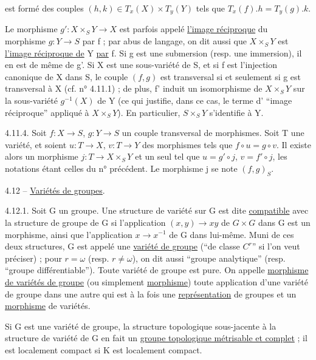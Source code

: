 est formé des couples $(h,k)\in T_x(X)\times T_y(Y)$ tels que $T_x(f).h=T_y(g).k$.

Le morphisme $g':X\times_S Y\longrightarrow X$ est parfois appelé \uline{l'image réciproque} du morphisme $g:Y\longrightarrow S$ par f ; par abus de langage, on dit aussi que $X\times_S Y$ est \uline{l'image réciproque de} Y \uline{par} f. Si g est une submersion (resp. une immersion), il en est de même de g'. Si X est une sous-variété de S, et si f est l'injection canonique de X dans S, le couple $(f,g)$ est transversal si et seulement si g est transversal à X (cf. n° 4.11.1) ; de plus, f' induit un isomorphisme de $X\times_S Y$ sur la sous-variété $g^{-1}(X)$ de Y (ce qui justifie, dans ce cas, le terme d' ``image réciproque'' appliqué à $X\times_S Y$). En particulier, $S\times_S Y$ s'identifie à Y.

4.11.4. Soit $f:X\longrightarrow S$, $g:Y\longrightarrow S$ un couple transversal de morphismes. Soit T une variété, et soient $u:T\longrightarrow X$, $v:T\longrightarrow Y$ des morphismes tels que $f\circ u=g\circ v$. Il existe alors un morphisme $j:T\longrightarrow X\times_S Y$ et un seul tel que $u=g'\circ j$, $v=f'\circ j$, les notations étant celles du n° précédent. Le morphisme j se note $(f,g)_S$.

4.12 -- \uline{Variétés de groupes}.

4.12.1. Soit G un groupe. Une structure de variété sur G est dite \uline{compatible} avec la structure de groupe de G si l'application $(x,y)\longrightarrow xy$ de $G\times G$ dans G est un morphisme, ainsi que l'application $x\longrightarrow x^{-1}$ de G dans lui-même. Muni de ces deux structures, G est appelé une \uline{variété de groupe} (``de classe $C^r$'' si l'on veut préciser) ; pour $r=\omega$ (resp. $r\ne\omega$), on dit aussi ``groupe analytique'' (resp. ``groupe différentiable''). Toute variété de groupe est pure. On appelle \uline{morphisme de variétés de groupe} (ou simplement \uline{morphisme}) toute application d'une variété de groupe dans une autre qui est à la fois une \uline{représentation} de groupes et un \uline{morphisme} de variétés.

Si G est une variété de groupe, la structure topologique sous-jacente à la structure de variété de G en fait un \uline{groupe topologique métrisable et complet} ; il est localement compact si K est localement compact.
